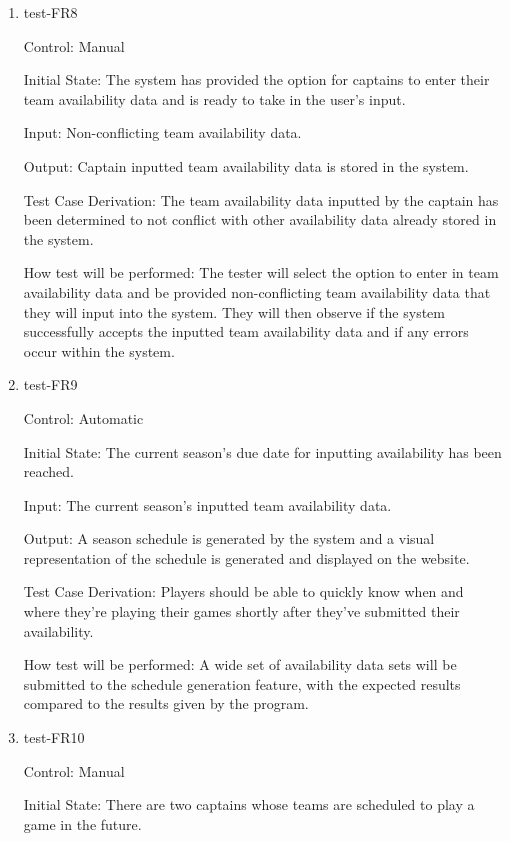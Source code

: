 \documentclass[12pt, titlepage]{article}
\begin{document}
\begin{enumerate}

  \item{test-FR8\\}

  Control: Manual

  Initial State: The system has provided the option for captains to enter their team
  availability data and is ready to take in the user's input.

  Input: Non-conflicting team availability data.

  Output: Captain inputted team availability data is stored in the system.

  Test Case Derivation: The team availability data inputted by the captain has been
  determined to not conflict with other availability data already stored in the system.

  How test will be performed: The tester will select the option to enter in team 
  availability data and be provided non-conflicting team availability
  data that they will input into the system. They will then observe if the system successfully
  accepts the inputted team availability data and if any errors occur within the system.

  \item{test-FR9\\}

  Control: Automatic

  Initial State: The current season's due date for inputting availability
  has been reached.

  Input: The current season's inputted team availability data.

  Output: A season schedule is generated by the system and a visual
  representation of the schedule is generated and displayed on the website.

  Test Case Derivation: Players should be able to quickly know when and where
  they're playing their games shortly after they've submitted their availability.

  How test will be performed: A wide set of availability data sets will be
  submitted to the schedule generation feature, with the expected results
  compared to the results given by the program.

  \item{test-FR10\\}

  Control: Manual

  Initial State: There are two captains whose teams are scheduled to play a
  game in the future.


\end{enumerate}
\end{document}
